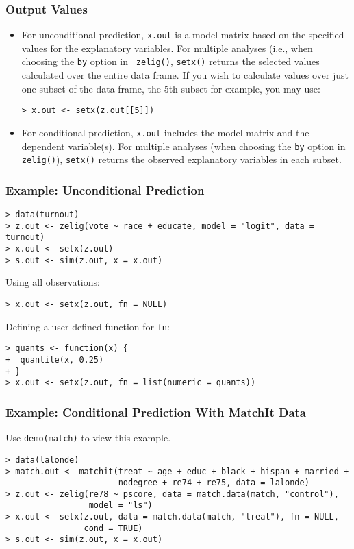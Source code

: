 \subsubsection{Output Values}
\begin{itemize}
\item For unconditional prediction, {\tt x.out} is a model matrix
  based on the specified values for the explanatory variables.  For
  multiple analyses (i.e., when choosing the {\tt by} option in {\tt
    zelig()}, {\tt setx()} returns the selected values calculated over
  the entire data frame.  If you wish to calculate values over just
  one subset of the data frame, the 5th subset for example, you may
  use:
\begin{verbatim}
> x.out <- setx(z.out[[5]])
\end{verbatim}
  
\item For conditional prediction, {\tt x.out} includes the model matrix
  and the dependent variable(s).  For multiple analyses (when choosing
  the {\tt by} option in {\tt zelig()}), {\tt setx()} returns the
  observed explanatory variables in each subset.
\end{itemize}

\subsubsection{Example: Unconditional Prediction}
\begin{verbatim}
> data(turnout) 
> z.out <- zelig(vote ~ race + educate, model = "logit", data = turnout)
> x.out <- setx(z.out)
> s.out <- sim(z.out, x = x.out)
\end{verbatim}
Using all observations:
\begin{verbatim}
> x.out <- setx(z.out, fn = NULL)
\end{verbatim}
Defining a user defined function for {\tt fn}:
\begin{verbatim}
> quants <- function(x) {
+  quantile(x, 0.25)
+ }
> x.out <- setx(z.out, fn = list(numeric = quants))
\end{verbatim} 

\subsubsection{Example: Conditional Prediction With MatchIt Data}
Use {\tt demo(match)} to view this example.  
\begin{verbatim}
> data(lalonde)
> match.out <- matchit(treat ~ age + educ + black + hispan + married + 
                       nodegree + re74 + re75, data = lalonde)
> z.out <- zelig(re78 ~ pscore, data = match.data(match, "control"), 
                 model = "ls")
> x.out <- setx(z.out, data = match.data(match, "treat"), fn = NULL, 
                cond = TRUE)
> s.out <- sim(z.out, x = x.out)
\end{verbatim}

